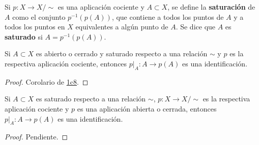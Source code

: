 

\begin{definition}
Si $p : X \longrightarrow X/\sim$ es una aplicación cociente y $A \subset X$, se define la \textbf{saturación} de $A$ como el conjunto $p^{-1}(p(A))$, que contiene a todos los puntos de $A$ y a todos los puntos en $X$ equivalentes a algún punto de $A$. Se dice que $A$ es \textbf{saturado} si $A = p^{-1}(p(A))$.
\end{definition}

\begin{proposition}
Si $A \subset X$ es abierto o cerrado y saturado respecto a una relación $\sim$ y $p$ es la respectiva aplicación cociente, entonces $p|_A : A \longrightarrow p(A)$ es una identificación.
\end{proposition}

\begin{proof}
Corolario de \hyperref[card:1c8]{\textsf{1c8}}.
\end{proof}

\begin{proposition}
Si $A \subset X$ es saturado respecto a una relación $\sim$, $p : X \longrightarrow X/\sim$ es la respectiva aplicación cociente y $p$ es una aplicación abierta o cerrada, entonces $p|_A : A \longrightarrow p(A)$ es una identificación.
\end{proposition}

\begin{proof}
Pendiente.
\end{proof}
